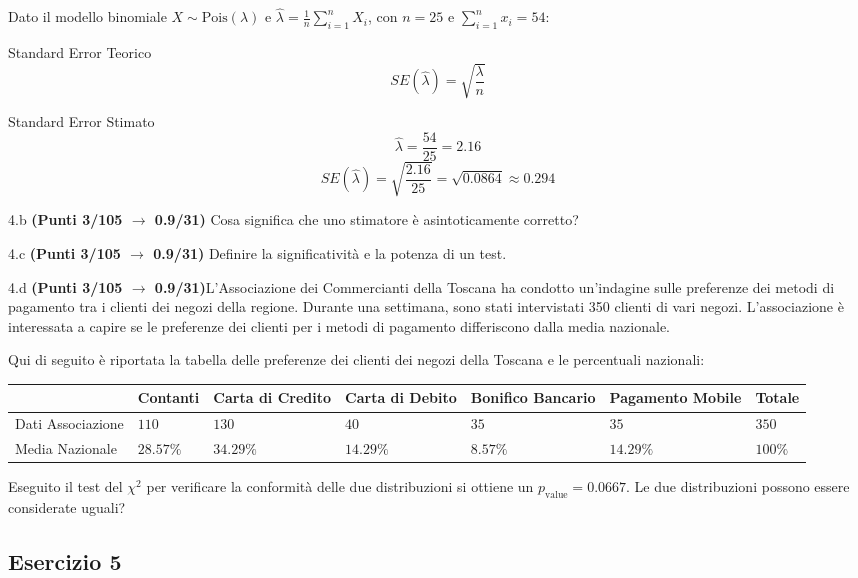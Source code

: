 \documentclass[
  11pt,
]{book}
\theoremstyle{mytheoremstyle}
\theoremstyle{mydefstyle}
\newenvironment{sol}
  {
  \begin{tcolorbox}[enhanced,breakable,arc=0.1mm,boxrule=1pt,colback=white,colframe=iblue,
  title=\bf \fontfamily{lmss}\selectfont \hspace{.5 cm} Soluzione,drop fuzzy shadow]

}{
\end{tcolorbox}
  }
\begin{document}
\begin{sol}
Dato il modello binomiale \(X \sim \text{Pois}(\lambda)\) e \(\hat\lambda = \frac{1}{n} \sum_{i=1}^n X_i\), con \(n = 25\) e \(\sum_{i=1}^n x_i = 54\):

Standard Error Teorico
\[
SE(\hat\lambda) = \sqrt{\frac{\lambda}{n}}
\]

Standard Error Stimato
\[
\hat\lambda = \frac{54}{25} = 2.16
\]
\[
SE(\hat\lambda) = \sqrt{\frac{2.16}{25}} = \sqrt{0.0864} \approx 0.294
\]

\end{sol}

4.b \textbf{(Punti 3/105 \(\rightarrow\) 0.9/31)} Cosa significa che uno stimatore è asintoticamente corretto?

4.c \textbf{(Punti 3/105 \(\rightarrow\) 0.9/31)} Definire la significatività e la potenza di un test.

4.d \textbf{(Punti 3/105 \(\rightarrow\) 0.9/31)}L'Associazione dei Commercianti della Toscana ha condotto un'indagine sulle preferenze dei metodi di pagamento tra i clienti dei negozi della regione. Durante una settimana, sono stati intervistati 350 clienti di vari negozi. L'associazione è interessata a capire se le preferenze dei clienti per i metodi di pagamento differiscono dalla media nazionale.

Qui di seguito è riportata la tabella delle preferenze dei clienti dei negozi della Toscana e le percentuali nazionali:

\begin{table}[H]
\centering
\begin{tabular}{lllllll}
\toprule
  & Contanti & Carta di Credito & Carta di Debito & Bonifico Bancario & Pagamento Mobile & Totale\\
\midrule
Dati Associazione & $110$ & $130$ & $40$ & $35$ & $35$ & $350$\\
Media Nazionale & $28.57\%$ & $34.29\%$ & $14.29\%$ & $8.57\%$ & $14.29\%$ & $100\%$\\
\bottomrule
\end{tabular}
\end{table}

Eseguito il test del \(\chi^2\) per verificare la conformità delle due distribuzioni si ottiene un \(p_\text{value}=0.0667\). Le due distribuzioni possono essere considerate uguali?

\subsection{Esercizio 5}\label{esercizio-5-40}
\end{document}
